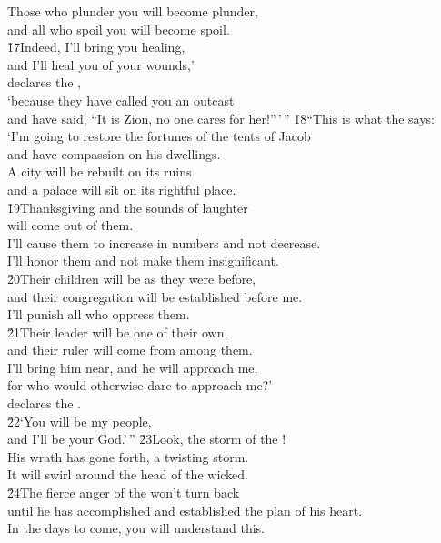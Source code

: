 \begin{poetry}
\poeml Those who plunder you will become plunder, \\
\poemll    and all who spoil you will become spoil. \\
\poeml \v{17}Indeed, I'll bring you healing, \\
\poemll    and I'll heal you of your wounds,' \\
\poemlll       declares the , \\
\poeml `because they have called you an outcast \\
\poemll    and have said, ``It is Zion, no one cares for her!''\,'\,''
\poeml \v{18}``This is what the  says: \\
\poeml `I'm going to restore the fortunes of the tents of Jacob \\
\poemll    and have compassion on his dwellings. \\
\poeml A city will be rebuilt on its ruins \\
\poemll    and a palace will sit on its rightful place. \\
\poeml \v{19}Thanksgiving and the sounds of laughter \\
\poemll    will come out of them. \\
\poeml I'll cause them to increase in numbers and not decrease. \\
\poemll    I'll honor them and not make them insignificant. \\
\poeml \v{20}Their children will be as they were before, \\
\poemll    and their congregation will be established before me. \\
\poeml I'll punish all who oppress them. \\
\poeml \v{21}Their leader will be one of their own, \\
\poemll    and their ruler will come from among them. \\
\poeml I'll bring him near, and he will approach me, \\
\poemll    for who would otherwise dare to approach me?' \\
\poemlll       declares the . \\
\poeml \v{22}`You will be my people, \\
\poemll    and I'll be your God.'\,''
\poeml \v{23}Look, the storm of the ! \\
\poemll    His wrath has gone forth, a twisting storm. \\
\poemlll       It will swirl around the head of the wicked. \\
\poeml \v{24}The fierce anger of the  won't turn back \\
\poemll    until he has accomplished and established the plan of his heart. \\
\poeml In the days to come, you will understand this.
\end{poetry}
